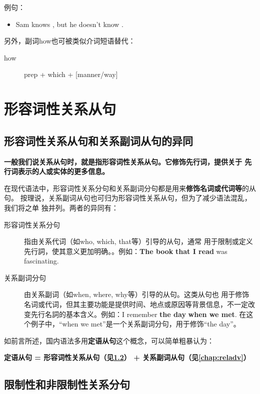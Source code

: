 例句：
\begin{itemize}
\item Sam knows  , but he doesn't know
       .
\end{itemize}

另外，副词how也可被类似介词短语替代：
\begin{description}
\item[how] prep + which + [manner/way]
\end{description}

\chapter{形容词性关系从句}

\section{形容词性关系从句和关系副词从句的异同}

\textbf{一般我们说关系从句时，就是指形容词性关系从句。它修饰先行词，提供关于
  先行词表示的人或实体的更多信息。}

在现代语法中，形容词性关系分句和关系副词分句都是用来\textbf{修饰名词或代词等}的从句。
按理说，关系副词从句也可归为形容词性关系从句，但为了减少语法混乱，我们将之单
独并列。两者的异同有：

\begin{description}
\item[形容词性关系分句] 指由关系代词（如who, which, that等）引导的从句，通常
  用于限制或定义先行詞，使其意义更加明确。。例如：\textbf{The book}
  \textbf{that I read} was fascinating.

\item[关系副词分句] 由关系副词（如when, where, why等）引导的从句。这类从句也
  用于修饰名词或代词，但其主要功能是提供时间、地点或原因等背景信息，不一定改
  变先行名詞的基本含义。例如：I remember \textbf{the day} \textbf{when we
    met}. 在这个例子中，“when we met”是一个关系副词分句，用于修饰“the
  day”。
\end{description}


如前言所述，国内语法多用\textbf{定语从句}这个概念，可以简单粗暴认为：

\textbf{定语从句 = 形容词性关系从句（见\cref{}） + 关系副词从句（见\cref{chap:reladv}）}


\section{限制性和非限制性关系分句}


